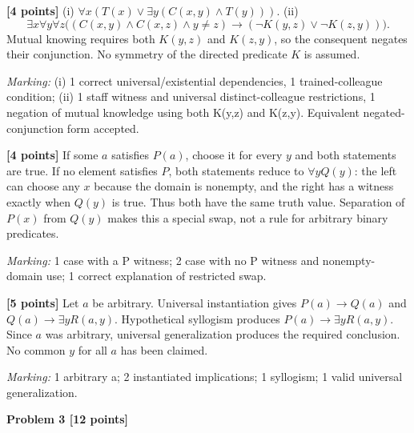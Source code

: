 \documentclass[12pt,letterpaper]{article}
\newcommand{\problemheading}[2][5\baselineskip]{\Needspace{#1}\par\noindent\hspace*{-0.625in}\textbf{#2}\par\nobreak\vspace{0.3em}}
\begin{document}
\begin{description}[font=\normalfont,leftmargin=1.2em,labelsep=0.4em]
\item[(a)] \textbf{[4 points]} (i) $\forall x(T(x)\lor\exists y(C(x,y)\land T(y)))$. (ii)\[\exists x\forall y\forall z\bigl((C(x,y)\land C(x,z)\land y\ne z)\to(\neg K(y,z)\lor\neg K(z,y))\bigr).\] Mutual knowing requires both $K(y,z)$ and $K(z,y)$, so the consequent negates their conjunction. No symmetry of the directed predicate $K$ is assumed.
\par\textit{Marking:} (i) 1 correct universal/existential dependencies, 1 trained-colleague condition; (ii) 1 staff witness and universal distinct-colleague restrictions, 1 negation of mutual knowledge using both K(y,z) and K(z,y). Equivalent negated-conjunction form accepted.
\item[(b)] \textbf{[4 points]} If some $a$ satisfies $P(a)$, choose it for every $y$ and both statements are true. If no element satisfies $P$, both statements reduce to $\forall yQ(y)$: the left can choose any $x$ because the domain is nonempty, and the right has a witness exactly when $Q(y)$ is true. Thus both have the same truth value. Separation of $P(x)$ from $Q(y)$ makes this a special swap, not a rule for arbitrary binary predicates.
\par\textit{Marking:} 1 case with a P witness; 2 case with no P witness and nonempty-domain use; 1 correct explanation of restricted swap.
\item[(c)] \textbf{[5 points]} Let $a$ be arbitrary. Universal instantiation gives $P(a)\to Q(a)$ and $Q(a)\to\exists yR(a,y)$. Hypothetical syllogism produces $P(a)\to\exists yR(a,y)$. Since $a$ was arbitrary, universal generalization produces the required conclusion. No common $y$ for all $a$ has been claimed.
\par\textit{Marking:} 1 arbitrary a; 2 instantiated implications; 1 syllogism; 1 valid universal generalization.
\end{description}
\vspace{0.65em}
\problemheading[\dimexpr 3\baselineskip+4\baselineskip\relax]{Problem 3 [12 points]}
\end{document}
